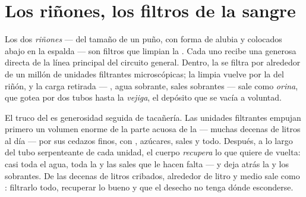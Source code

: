 \section{Los riñones, los filtros de la sangre}

\begin{definition}\label{def:g7:removing-wastes:kidneys}
Los dos \emph{riñones} --- del tamaño de un puño, con
forma de alubia y colocados abajo en la espalda --- son filtros que
limpian la . Cada uno recibe una  generosa directa de la
línea principal del circuito general. Dentro, la  se filtra por
alrededor de un millón de unidades filtrantes microscópicas; la 
limpia vuelve por la  del riñón, y la carga retirada --- , agua
sobrante, sales sobrantes --- sale como \emph{orina}, que
gotea por dos tubos hasta la \emph{vejiga}, el depósito
que se vacía a voluntad.
\end{definition}

\begin{proposition}\label{prop:g7:removing-wastes:filter}
El truco del  es generosidad seguida de tacañería. Las unidades
filtrantes empujan primero un volumen enorme de la parte acuosa de la
 --- muchas decenas de litros al día --- por sus cedazos finos,
con , azúcares, sales y todo. Después, a lo largo del tubo
serpenteante de cada unidad, el cuerpo \emph{recupera} lo que quiere de
vuelta: casi toda el agua, toda la  y las sales que le hacen
falta --- y deja atrás la  y los sobrantes. De las decenas de
litros cribados, alrededor de litro y medio sale como : filtrarlo
todo, recuperar lo bueno y que el desecho no tenga dónde esconderse.
\end{proposition}
\admitted

